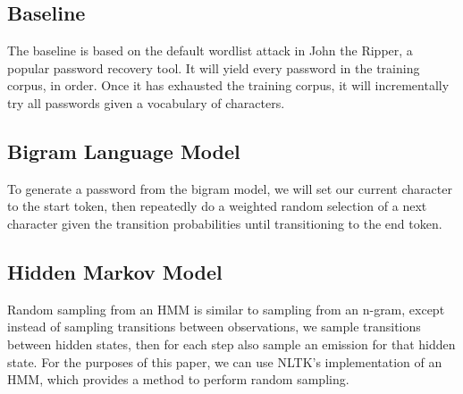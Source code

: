 \documentclass{amsart}
\theoremstyle{definition}
\theoremstyle{remark}
\numberwithin{equation}{section}
\begin{document}
\subsection{Baseline}
The baseline is based on the default wordlist attack in John the Ripper, a popular password recovery tool. It will yield every password in the training corpus, in order. Once it has exhausted the training corpus, it will incrementally try all passwords given a vocabulary of characters.
\subsection{Bigram Language Model}
To generate a password from the bigram model, we will set our current character to the start token, then repeatedly do a weighted random selection of a next character given the transition probabilities until transitioning to the end token.
\subsection{Hidden Markov Model}
Random sampling from an HMM is similar to sampling from an n-gram, except instead of sampling transitions between observations, we sample transitions between hidden states, then for each step also sample an emission for that hidden state. For the purposes of this paper, we can use NLTK's implementation of an HMM, which provides a method to perform random sampling.
\end{document}
